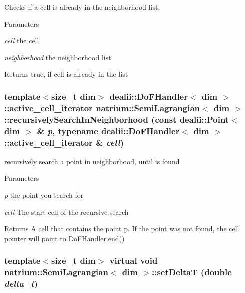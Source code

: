 Checks if a cell is already in the neighborhood list. 
\begin{DoxyParams}{Parameters}
\item[{\em cell}]the cell \item[{\em neighborhood}]the neighborhood list \end{DoxyParams}
\begin{DoxyReturn}{Returns}
true, if cell is already in the list 
\end{DoxyReturn}
\hypertarget{classnatrium_1_1SemiLagrangian_a8d075c2ae01b26d66999782cc14c5515}{
\subsubsection[{recursivelySearchInNeighborhood}]{\setlength{\rightskip}{0pt plus 5cm}template$<$size\_\-t dim$>$ dealii::DoFHandler$<$ dim $>$::active\_\-cell\_\-iterator {\bf natrium::SemiLagrangian}$<$ dim $>$::recursivelySearchInNeighborhood (const dealii::Point$<$ dim $>$ \& {\em p}, \/  typename dealii::DoFHandler$<$ dim $>$::active\_\-cell\_\-iterator \& {\em cell})}}
\label{classnatrium_1_1SemiLagrangian_a8d075c2ae01b26d66999782cc14c5515}


recursively search a point in neighborhood, until is found 
\begin{DoxyParams}{Parameters}
\item[{\em p}]the point you search for \item[{\em cell}]The start cell of the recursive search \end{DoxyParams}
\begin{DoxyReturn}{Returns}
A cell that contains the point p. If the point was not found, the cell pointer will point to DoFHandler.end() 
\end{DoxyReturn}
\hypertarget{classnatrium_1_1SemiLagrangian_abd17b628b89c43303d067c0a4e4d0bf1}{
\subsubsection[{setDeltaT}]{\setlength{\rightskip}{0pt plus 5cm}template$<$size\_\-t dim$>$ virtual void {\bf natrium::SemiLagrangian}$<$ dim $>$::setDeltaT (double {\em delta\_\-t})}}
\label{classnatrium_1_1SemiLagrangian_abd17b628b89c43303d067c0a4e4d0bf1}


